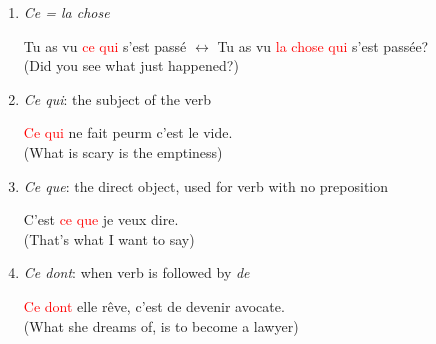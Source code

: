\documentclass{book}
\begin{document}
\begin{enumerate}
\begin{itemize}
                    \item pour: travailler pour
                        \begin{center}
                            \textcolor{red}{Ce pour quoi} il travaille, c'est sa famille. \\
                            (What he works for, is his family)
                        \end{center}
                    
                    \item sur: s'appayer sur
                        \begin{center}
                            \textcolor{red}{Ce sur quoi} je m'appuie, ce sont les lois. \\
                            (What I am relying on, are the laws)
                        \end{center}
                \end{itemize}

            \item \textit{Ce = la chose}
                \begin{center}
                    Tu as vu \textcolor{red}{ce qui} s'est passé $\longleftrightarrow$ Tu as vu \textcolor{red}{la chose qui} s'est passée? \\
                    (Did you see what just happened?)
                \end{center}

            \item \textit{Ce qui}: the subject of the verb
                \begin{center}
                    \textcolor{red}{Ce qui} ne fait peurm c'est le vide. \\
                    (What is scary is the emptiness)
                \end{center}
            
            \item \textit{Ce que}: the direct object, used for verb with no preposition
                \begin{center}
                    C'est \textcolor{red}{ce que} je veux dire. \\
                    (That's what I want to say)
                \end{center}
                
            \item \textit{Ce dont}: when verb is followed by \textit{de}
                \begin{center}
                    \textcolor{red}{Ce dont} elle rêve, c'est de devenir avocate. \\
                    (What she dreams of, is to become a lawyer)
                \end{center}
            

\end{enumerate}
\end{document}
